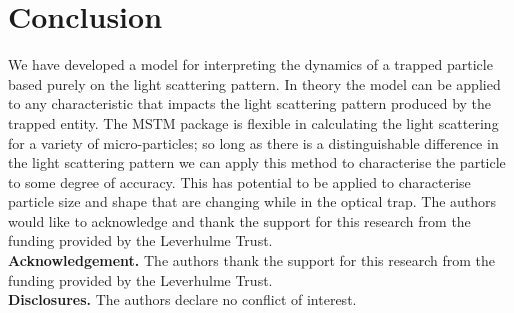 \documentclass[final, 3p]{elsarticle}
\begin{document}
\section{Conclusion}
\label{sec:Conclusion}

We have developed a model for interpreting the dynamics of a trapped particle based purely on the light scattering pattern. In theory the model can be applied to any characteristic that impacts the light scattering pattern produced by the trapped entity. The MSTM package is flexible in calculating the light scattering for a variety of micro-particles; so long as there is a distinguishable difference in the light scattering pattern we can apply this method to characterise the particle to some degree of accuracy. This has potential to be applied to characterise particle size and shape that are changing while in the optical trap. The authors would like to acknowledge and thank the support for this research from the funding provided by the Leverhulme Trust.\\



\noindent \textbf{Acknowledgement.} The authors thank the support for this research from the funding provided by the Leverhulme Trust. \\
  
\noindent \textbf{Disclosures.} The authors declare no conflict of interest. \\


 



\newpage
\appendix
\onecolumn
\end{document}
